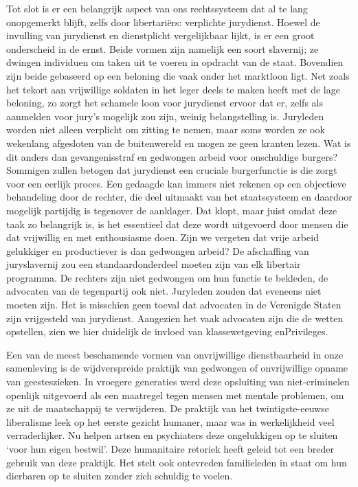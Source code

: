 \documentclass[
  a5paper,
  smalldemyvopaper,10pt,twoside,onecolumn,openright,extrafontsizes,hidelinks]{memoir}
\begin{document}
Tot slot is er een belangrijk aspect van ons rechtssysteem dat al te
lang onopgemerkt blijft, zelfs door libertariërs: verplichte jurydienst.
Hoewel de invulling van jurydienst en dienstplicht vergelijkbaar lijkt,
is er een groot onderscheid in de ernst. Beide vormen zijn namelijk een
soort slavernij; ze dwingen individuen om taken uit te voeren in
opdracht van de staat. Bovendien zijn beide gebaseerd op een beloning
die vaak onder het marktloon ligt. Net zoals het tekort aan vrijwillige
soldaten in het leger deels te maken heeft met de lage beloning, zo
zorgt het schamele loon voor jurydienst ervoor dat er, zelfs als
aanmelden voor jury's mogelijk zou zijn, weinig belangstelling is.
Juryleden worden niet alleen verplicht om zitting te nemen, maar soms
worden ze ook wekenlang afgesloten van de buitenwereld en mogen ze geen
kranten lezen. Wat is dit anders dan gevangenisstraf en gedwongen arbeid
voor onschuldige burgers? Sommigen zullen betogen dat jurydienst een
cruciale burgerfunctie is die zorgt voor een eerlijk proces. Een
gedaagde kan immers niet rekenen op een objectieve behandeling door de
rechter, die deel uitmaakt van het staatssysteem en daardoor mogelijk
partijdig is tegenover de aanklager. Dat klopt, maar juist omdat deze
taak zo belangrijk is, is het essentieel dat deze wordt uitgevoerd door
mensen die dat vrijwillig en met enthousiasme doen. Zijn we vergeten dat
vrije arbeid gelukkiger en productiever is dan gedwongen arbeid? De
afschaffing van juryslavernij zou een standaardonderdeel moeten zijn van
elk libertair programma. De rechters zijn niet gedwongen om hun functie
te bekleden, de advocaten van de tegenpartij ook niet. Juryleden zouden
dat eveneens niet moeten zijn. Het is misschien geen toeval dat
advocaten in de Verenigde Staten zijn vrijgesteld van jurydienst.
Aangezien het vaak advocaten zijn die de wetten opstellen, zien we hier
duidelijk de invloed van klassewetgeving enPrivileges.

Een van de meest beschamende vormen van onvrijwillige dienstbaarheid in
onze samenleving is de wijdverspreide praktijk van gedwongen of
onvrijwillige opname van geesteszieken. In vroegere generaties werd deze
opsluiting van niet-criminelen openlijk uitgevoerd als een maatregel
tegen mensen met mentale problemen, om ze uit de maatschappij te
verwijderen. De praktijk van het twintigste-eeuwse liberalisme leek op
het eerste gezicht humaner, maar was in werkelijkheid veel
verraderlijker. Nu helpen artsen en psychiaters deze ongelukkigen op te
sluiten `voor hun eigen bestwil'. Deze humanitaire retoriek heeft geleid
tot een breder gebruik van deze praktijk. Het stelt ook ontevreden
familieleden in staat om hun dierbaren op te sluiten zonder zich
schuldig te voelen.
\end{document}
